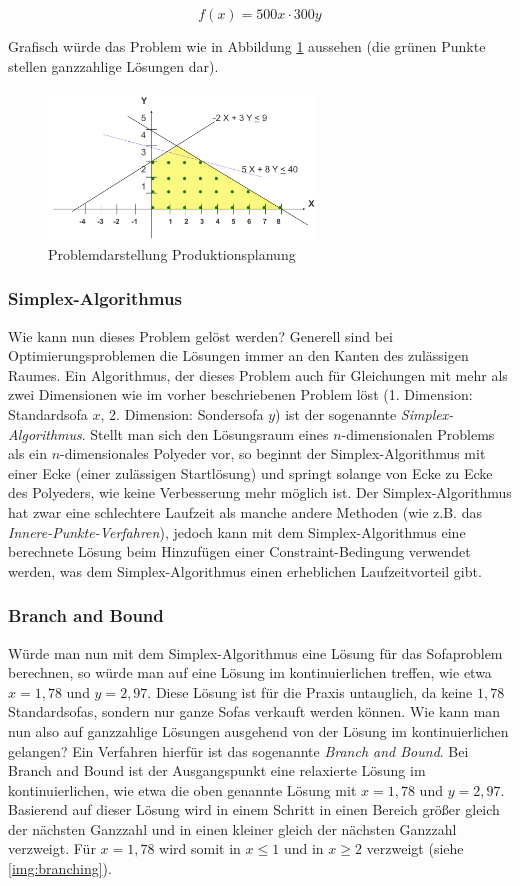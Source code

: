 \documentclass[a4paper, 11pt]{article}
\begin{document}
$$f(x) = 500x \cdot 300y$$

Grafisch würde das Problem wie in Abbildung \ref{img:graphical_problem} aussehen
(die grünen Punkte stellen ganzzahlige Lösungen dar).
\begin{figure}
  \centering
  \includegraphics[width=\linewidth,height=150px,keepaspectratio]{example_graphical_representation.png}
  \caption{Problemdarstellung Produktionsplanung}
  \label{img:graphical_problem}
\end{figure}

\subsubsection{Simplex-Algorithmus}
Wie kann nun dieses Problem gelöst werden? Generell sind bei Optimierungsproblemen
die Lösungen immer an den Kanten des zulässigen Raumes. Ein Algorithmus, der dieses
Problem auch für Gleichungen mit mehr als zwei Dimensionen wie im vorher beschriebenen
Problem löst (1. Dimension: Standardsofa $x$, 2. Dimension: Sondersofa $y$) ist der
sogenannte \textit{Simplex-Algorithmus}. Stellt man sich den Lösungsraum eines
$n$-dimensionalen Problems als ein $n$-dimensionales Polyeder vor, so beginnt
der Simplex-Algorithmus mit einer Ecke (einer zulässigen Startlösung) und springt
solange von Ecke zu Ecke des Polyeders, wie keine Verbesserung mehr möglich ist.
Der Simplex-Algorithmus hat zwar eine schlechtere Laufzeit als manche andere Methoden
(wie z.B. das \textit{Innere-Punkte-Verfahren}), jedoch kann mit dem Simplex-Algorithmus
eine berechnete Lösung beim Hinzufügen einer Constraint-Bedingung verwendet werden,
was dem Simplex-Algorithmus einen erheblichen Laufzeitvorteil gibt.

\subsubsection{Branch and Bound}
Würde man nun mit dem Simplex-Algorithmus eine Lösung für das Sofaproblem berechnen,
so würde man auf eine Lösung im kontinuierlichen treffen, wie etwa $x = 1,78$ und
$y = 2,97$. Diese Lösung ist für die Praxis untauglich, da keine $1,78$ Standardsofas,
sondern nur ganze Sofas verkauft werden können. Wie kann man nun also auf ganzzahlige
Lösungen ausgehend von der Lösung im kontinuierlichen gelangen?
Ein Verfahren hierfür ist das sogenannte \textit{Branch and Bound}. Bei Branch
and Bound ist der Ausgangspunkt eine relaxierte Lösung im kontinuierlichen,
wie etwa die oben genannte Lösung mit $x = 1,78$ und $y = 2,97$.
Basierend auf dieser Lösung wird in einem Schritt in einen Bereich größer
gleich der nächsten Ganzzahl und in einen kleiner gleich der nächsten
Ganzzahl verzweigt. Für $x = 1,78$ wird somit in $x \leq 1$ und in $x \geq 2$
verzweigt (siehe \ref{img:branching}).
\end{document}
